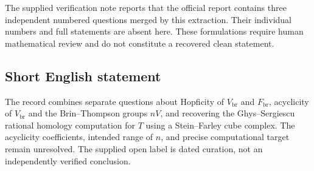 \documentclass[11pt]{article}
\begin{document}
The supplied verification note reports that the official report contains three independent numbered questions merged by this extraction. Their individual numbers and full statements are absent here. These formulations require human mathematical review and do not constitute a recovered clean statement.
\subsection{Short English statement}
The record combines separate questions about Hopficity of \(V_{\mathrm{br}}\) and \(F_{\mathrm{br}}\), acyclicity of \(V_{\mathrm{br}}\) and the Brin--Thompson groups \(nV\), and recovering the Ghys--Sergiescu rational homology computation for \(T\) using a Stein--Farley cube complex. The acyclicity coefficients, intended range of \(n\), and precise computational target remain unresolved. The supplied open label is dated curation, not an independently verified conclusion.
\end{document}
